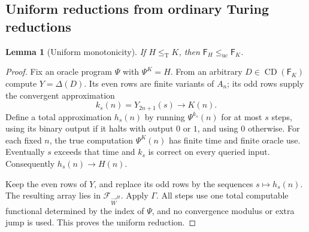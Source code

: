 \documentclass[11pt,letterpaper]{article}
\theoremstyle{plain}
\newtheorem{lemma}[theorem]{Lemma}
\theoremstyle{definition}
\theoremstyle{remark}
\numberwithin{equation}{section}
\newcommand{\leT}{\leq_{\mathrm T}}
\newcommand{\leuc}{\leq_{\mathrm{uc}}}
\newcommand{\CD}{\operatorname{CD}}
\newcommand{\Fint}{\mathsf F}            %
\newcommand{\FF}{\mathcal F}             %
\newcommand{\WW}{\vec W}                 %
\begin{document}
\subsection{Uniform reductions from ordinary Turing reductions}
\begin{lemma}[Uniform monotonicity]\label{cr12:ep:lem:uniform-mono}
If $H\leT K$, then $\Fint_H\leuc \Fint_K$.
\end{lemma}
\begin{proof}
Fix an oracle program $\Psi$ with $\Psi^K=H$. From an arbitrary $D\in\CD(\Fint_K)$
compute $Y=\Delta(D)$. Its even rows are finite variants of $A_n$; its odd rows
supply the convergent approximation
\[
 k_s(n)=Y_{2n+1}(s)\longrightarrow K(n).
\]
Define a total approximation $h_s(n)$ by running $\Psi^{k_s}(n)$ for at most $s$
steps, using its binary output if it halts with output $0$ or $1$, and using $0$
otherwise. For each fixed $n$, the true computation $\Psi^K(n)$ has finite time and
finite oracle use. Eventually $s$ exceeds that time and $k_s$ is correct on every
queried input. Consequently $h_s(n)\to H(n)$.

Keep the even rows of $Y$, and replace its odd rows by the sequences
$s\mapsto h_s(n)$. The resulting array lies in $\FF_{\WW^H}$. Apply $\Gamma$. All
steps use one total computable functional determined by the index of $\Psi$, and no
convergence modulus or extra jump is used. This proves the uniform reduction.
\end{proof}
\end{document}
